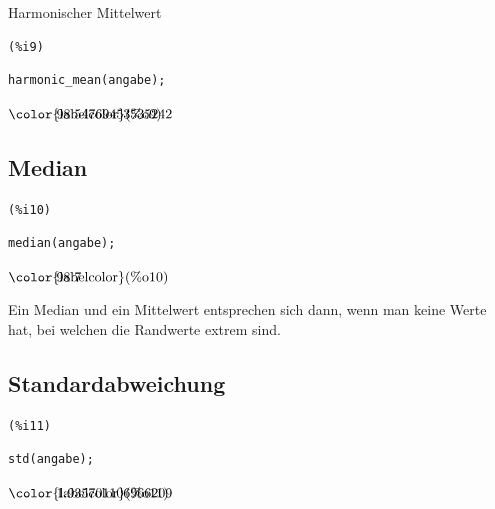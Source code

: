 \documentclass[12pt]{article}
\begin{document}
Harmonischer Mittelwert

\noindent
\begin{minipage}[t]{8ex}{\color{red}\bf
\begin{verbatim}
(%i9) 
\end{verbatim}}
\end{minipage}
\begin{minipage}[t]{\textwidth}{\color{blue}
\begin{verbatim}
harmonic_mean(angabe);
\end{verbatim}}
\end{minipage}
\begin{math}\displaystyle
\parbox{8ex}{\color{labelcolor}(\%o9) }
98.54769453535242
\end{math}


\subsection{Median}



\noindent
\begin{minipage}[t]{8ex}{\color{red}\bf
\begin{verbatim}
(%i10) 
\end{verbatim}}
\end{minipage}
\begin{minipage}[t]{\textwidth}{\color{blue}
\begin{verbatim}
median(angabe);
\end{verbatim}}
\end{minipage}
\begin{math}\displaystyle
\parbox{8ex}{\color{labelcolor}(\%o10) }
98.7
\end{math}

Ein Median und ein Mittelwert entsprechen sich dann, wenn man keine Werte hat, bei welchen die Randwerte extrem sind.

\subsection{Standardabweichung}



\noindent
\begin{minipage}[t]{8ex}{\color{red}\bf
\begin{verbatim}
(%i11) 
\end{verbatim}}
\end{minipage}
\begin{minipage}[t]{\textwidth}{\color{blue}
\begin{verbatim}
std(angabe);
\end{verbatim}}
\end{minipage}
\begin{math}\displaystyle
\parbox{8ex}{\color{labelcolor}(\%o11) }
1.935701106966209
\end{math}
\end{document}
